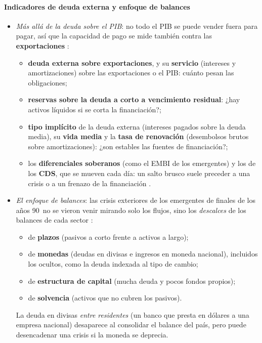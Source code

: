 \documentclass[11pt]{article}
\begin{document}
\paragraph{Indicadores de deuda externa y enfoque de balances}
\begin{itemize}
\item \emph{Más allá de la deuda sobre el PIB}: no todo el PIB se puede vender fuera para pagar, así que la capacidad de pago se mide también contra las \textbf{exportaciones} \parencite{FMI2014DeudaExterna}:
  \begin{itemize}
  \item \textbf{deuda externa sobre exportaciones}, y su \textbf{servicio} (intereses y amortizaciones) sobre las exportaciones o el PIB: cuánto pesan las obligaciones;
  \item \textbf{reservas sobre la deuda a corto a vencimiento residual}: ¿hay activos líquidos si se corta la financiación?;
  \item \textbf{tipo implícito} de la deuda externa (intereses pagados sobre la deuda media), su \textbf{vida media} y la \textbf{tasa de renovación} (desembolsos brutos sobre amortizaciones): ¿son estables las fuentes de financiación?;
  \item los \textbf{diferenciales soberanos} (como el EMBI de los emergentes) y los de los \textbf{CDS}, que se mueven cada día: un salto brusco suele preceder a una crisis o a un frenazo de la financiación \parencite{FMI2013CaseStudy}.
  \end{itemize}
\item \emph{El enfoque de balances}: las crisis exteriores de los emergentes de finales de los años 90~no se vieron venir mirando solo los flujos, sino los \emph{descalces} de los balances de cada sector \parencite{Allen2002Balances}:
  \begin{itemize}
  \item de \textbf{plazos} (pasivos a corto frente a activos a largo);
  \item de \textbf{monedas} (deudas en divisas e ingresos en moneda nacional), incluidos los ocultos, como la deuda indexada al tipo de cambio;
  \item de \textbf{estructura de capital} (mucha deuda y pocos fondos propios);
  \item de \textbf{solvencia} (activos que no cubren los pasivos).
  \end{itemize}
  La deuda en divisas \emph{entre residentes} (un banco que presta en dólares a una empresa nacional) desaparece al consolidar el balance del país, pero puede desencadenar una crisis si la moneda se deprecia.
\end{itemize}
\end{document}
